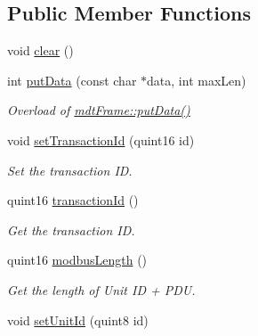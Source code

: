 \subsection*{Public Member Functions}
\begin{DoxyCompactItemize}
\item 
void \hyperlink{classmdt_frame_modbus_tcp_a622fd5104f4e91a96621e6b5e0f4f89f}{clear} ()
\item 
int \hyperlink{classmdt_frame_modbus_tcp_a0f684d77c03e5fb91598c9a10715bedb}{putData} (const char $\ast$data, int maxLen)
\begin{DoxyCompactList}\small\item\em Overload of \hyperlink{classmdt_frame_a51c355541b134e6e051167c70c09d531}{mdtFrame::putData()} \end{DoxyCompactList}\item 
\hypertarget{classmdt_frame_modbus_tcp_a3c5528d2e45111ec0563dfd3350177cd}{
void \hyperlink{classmdt_frame_modbus_tcp_a3c5528d2e45111ec0563dfd3350177cd}{setTransactionId} (quint16 id)}
\label{classmdt_frame_modbus_tcp_a3c5528d2e45111ec0563dfd3350177cd}

\begin{DoxyCompactList}\small\item\em Set the transaction ID. \end{DoxyCompactList}\item 
\hypertarget{classmdt_frame_modbus_tcp_a48a7e24190190da0ae9f5dbdfcd1ee48}{
quint16 \hyperlink{classmdt_frame_modbus_tcp_a48a7e24190190da0ae9f5dbdfcd1ee48}{transactionId} ()}
\label{classmdt_frame_modbus_tcp_a48a7e24190190da0ae9f5dbdfcd1ee48}

\begin{DoxyCompactList}\small\item\em Get the transaction ID. \end{DoxyCompactList}\item 
\hypertarget{classmdt_frame_modbus_tcp_a5213eb7e3670a191d2b75c83f5dd8d71}{
quint16 \hyperlink{classmdt_frame_modbus_tcp_a5213eb7e3670a191d2b75c83f5dd8d71}{modbusLength} ()}
\label{classmdt_frame_modbus_tcp_a5213eb7e3670a191d2b75c83f5dd8d71}

\begin{DoxyCompactList}\small\item\em Get the length of Unit ID + PDU. \end{DoxyCompactList}\item 
\hypertarget{classmdt_frame_modbus_tcp_ab6bb1765abd0910c6511954a17526243}{
void \hyperlink{classmdt_frame_modbus_tcp_ab6bb1765abd0910c6511954a17526243}{setUnitId} (quint8 id)}
\label{classmdt_frame_modbus_tcp_ab6bb1765abd0910c6511954a17526243}


\end{DoxyCompactItemize}
